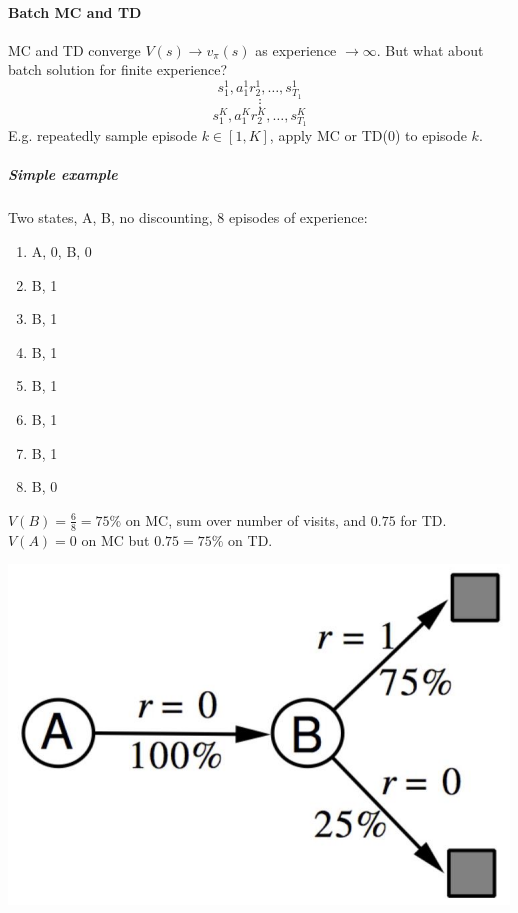 \documentclass[10pt]{report}
\begin{document}
\paragraph{Batch MC and TD} MC and TD converge $V(s) \rightarrow v_\pi(s)$ as experience $\rightarrow \infty$. But what about batch solution for finite experience?
$$s_1^1,a_1^1r_2^1,\ldots,s_{T_1}^1$$
$$\vdots$$
$$s_1^K,a_1^Kr_2^K,\ldots,s_{T_1}^K$$
E.g. repeatedly sample episode $k\in [1,K]$, apply MC or TD(0) to episode $k$.
\pagebreak
\subparagraph{Simple example} 
\begin{multicols}{2}
Two states, A, B, no discounting, 8 episodes of experience:
\begin{enumerate}
	\item A, 0, B, 0
	\item B, 1
	\item B, 1
	\item B, 1
	\item B, 1
	\item B, 1
	\item B, 1
	\item B, 0
\end{enumerate}
$V(B)=\frac{6}{8}=75\%$ on MC, sum over number of visits, and $0.75$ for TD.\\
$V(A)=0$ on MC but $0.75=75\%$ on TD.
\columnbreak
\begin{center}
	\includegraphics[scale=0.5]{174.png}
\end{center}
\end{multicols}
\end{document}
